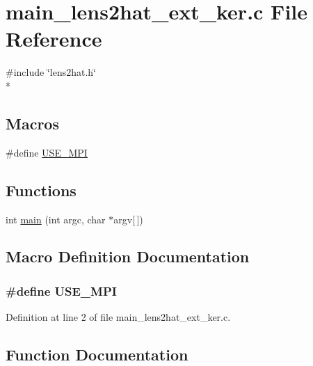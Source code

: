 \section{main\-\_\-lens2hat\-\_\-ext\-\_\-ker.\-c File Reference}
\label{main__lens2hat__ext__ker_8c}
{\ttfamily \#include \char`\"{}lens2hat.\-h\char`\"{}}\\*
\subsection*{Macros}
\begin{DoxyCompactItemize}
\item 
\#define \hyperlink{main__lens2hat__ext__ker_8c_a3869d282031f6ea6b50fdb980b758420}{U\-S\-E\-\_\-\-M\-P\-I}
\end{DoxyCompactItemize}
\subsection*{Functions}
\begin{DoxyCompactItemize}
\item 
int \hyperlink{main__lens2hat__ext__ker_8c_a0ddf1224851353fc92bfbff6f499fa97}{main} (int argc, char $\ast$argv\mbox{[}$\,$\mbox{]})
\end{DoxyCompactItemize}


\subsection{Macro Definition Documentation}
\subsubsection[{U\-S\-E\-\_\-\-M\-P\-I}]{\setlength{\rightskip}{0pt plus 5cm}\#define U\-S\-E\-\_\-\-M\-P\-I}\label{main__lens2hat__ext__ker_8c_a3869d282031f6ea6b50fdb980b758420}


Definition at line 2 of file main\-\_\-lens2hat\-\_\-ext\-\_\-ker.\-c.



\subsection{Function Documentation}
